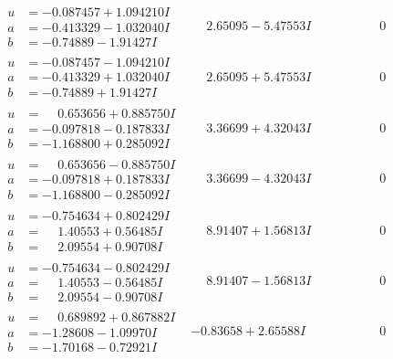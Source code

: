 \documentclass[1p]{elsarticle_modified}
\theoremstyle{definition}
\begin{document}
$$\begin{array}{c|c|c}
\begin{aligned}
u &= -0.087457 + 1.094210 I \\
a &= -0.413329 - 1.032040 I \\
b &= -0.74889 - 1.91427 I\end{aligned}
 & \phantom{-}2.65095 - 5.47553 I & \phantom{-0.000000 } 0 \\ \hline\begin{aligned}
u &= -0.087457 - 1.094210 I \\
a &= -0.413329 + 1.032040 I \\
b &= -0.74889 + 1.91427 I\end{aligned}
 & \phantom{-}2.65095 + 5.47553 I & \phantom{-0.000000 } 0 \\ \hline\begin{aligned}
u &= \phantom{-}0.653656 + 0.885750 I \\
a &= -0.097818 - 0.187833 I \\
b &= -1.168800 + 0.285092 I\end{aligned}
 & \phantom{-}3.36699 + 4.32043 I & \phantom{-0.000000 } 0 \\ \hline\begin{aligned}
u &= \phantom{-}0.653656 - 0.885750 I \\
a &= -0.097818 + 0.187833 I \\
b &= -1.168800 - 0.285092 I\end{aligned}
 & \phantom{-}3.36699 - 4.32043 I & \phantom{-0.000000 } 0 \\ \hline\begin{aligned}
u &= -0.754634 + 0.802429 I \\
a &= \phantom{-}1.40553 + 0.56485 I \\
b &= \phantom{-}2.09554 + 0.90708 I\end{aligned}
 & \phantom{-}8.91407 + 1.56813 I & \phantom{-0.000000 } 0 \\ \hline\begin{aligned}
u &= -0.754634 - 0.802429 I \\
a &= \phantom{-}1.40553 - 0.56485 I \\
b &= \phantom{-}2.09554 - 0.90708 I\end{aligned}
 & \phantom{-}8.91407 - 1.56813 I & \phantom{-0.000000 } 0 \\ \hline\begin{aligned}
u &= \phantom{-}0.689892 + 0.867882 I \\
a &= -1.28608 - 1.09970 I \\
b &= -1.70168 - 0.72921 I\end{aligned}
 & -0.83658 + 2.65588 I & \phantom{-0.000000 } 0 \\ \hline\begin{aligned}

\end{aligned}
\end{array}$$
\end{document}
